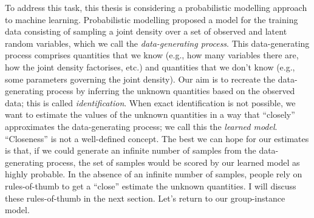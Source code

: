 \documentclass[../thesis.tex]{subfiles}
\begin{document}
To address this task, this thesis is considering a probabilistic modelling approach to machine learning. Probabilistic modelling proposed a model for the training data consisting of sampling a joint density over a set of observed and latent random variables, which we call the \textit{data-generating process}. This data-generating process comprises quantities that we know (e.g., how many variables there are, how the joint density factorises, etc.) and quantities that we don't know (e.g., some parameters governing the joint density). Our aim is to recreate the data-generating process by inferring the unknown quantities based on the observed data; this is called \textit{identification}. When exact identification is not possible, we want to estimate the values of the unknown quantities in a way that ``closely'' approximates the data-generating process; we call this the \textit{learned model}. ``Closeness'' is not a well-defined concept. The best we can hope for our estimates is that, if we could generate an infinite number of samples from the data-generating process, the set of samples would be scored by our learned model as highly probable. In the absence of an infinite number of samples, people rely on rules-of-thumb to get a ``close'' estimate the unknown quantities. I will discuss these rules-of-thumb in the next section. Let's return to our group-instance model.
\end{document}
